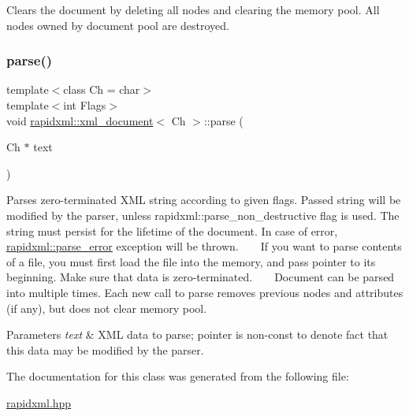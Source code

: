 Clears the document by deleting all nodes and clearing the memory pool. All nodes owned by document pool are destroyed. \mbox{\label{classrapidxml_1_1xml__document_ac6e73ff9ac323bf5a370c38feb03a6b1}} 
\subsubsection{\texorpdfstring{parse()}{parse()}}
{\footnotesize\ttfamily template$<$class Ch  = char$>$ \\
template$<$int Flags$>$ \\
void \mbox{\hyperlink{classrapidxml_1_1xml__document}{rapidxml\+::xml\+\_\+document}}$<$ Ch $>$\+::parse (\begin{DoxyParamCaption}\item[{Ch $\ast$}]{text }\end{DoxyParamCaption})\hspace{0.3cm}{\ttfamily [inline]}}

Parses zero-\/terminated X\+ML string according to given flags. Passed string will be modified by the parser, unless rapidxml\+::parse\+\_\+non\+\_\+destructive flag is used. The string must persist for the lifetime of the document. In case of error, \mbox{\hyperlink{classrapidxml_1_1parse__error}{rapidxml\+::parse\+\_\+error}} exception will be thrown. ~\newline
~\newline
 If you want to parse contents of a file, you must first load the file into the memory, and pass pointer to its beginning. Make sure that data is zero-\/terminated. ~\newline
~\newline
 Document can be parsed into multiple times. Each new call to parse removes previous nodes and attributes (if any), but does not clear memory pool. 
\begin{DoxyParams}{Parameters}
{\em text} & X\+ML data to parse; pointer is non-\/const to denote fact that this data may be modified by the parser. \\
\hline
\end{DoxyParams}


The documentation for this class was generated from the following file\+:\begin{DoxyCompactItemize}
\item 
\mbox{\hyperlink{rapidxml_8hpp}{rapidxml.\+hpp}}\end{DoxyCompactItemize}
